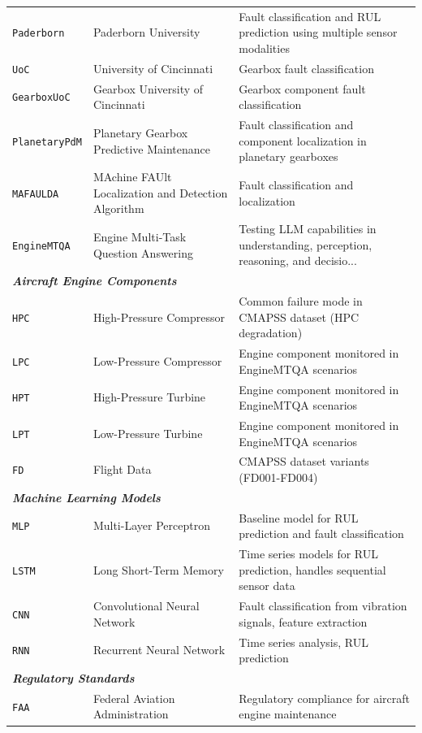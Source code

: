 \begin{table}[ht]
\begin{tabular}{@{}lll@{}}
\texttt{Paderborn} & Paderborn University & Fault classification and RUL prediction using multiple sensor modalities \\
\texttt{UoC} & University of Cincinnati & Gearbox fault classification \\
\texttt{GearboxUoC} & Gearbox University of Cincinnati & Gearbox component fault classification \\
\texttt{PlanetaryPdM} & Planetary Gearbox Predictive Maintenance & Fault classification and component localization in planetary gearboxes \\
\texttt{MAFAULDA} & MAchine FAUlt Localization and Detection Algorithm & Fault classification and localization \\
\texttt{EngineMTQA} & Engine Multi-Task Question Answering & Testing LLM capabilities in understanding, perception, reasoning, and decisio... \\
\midrule
\multicolumn{3}{l}{\textbf{\textit{Aircraft Engine Components}}} \\
\texttt{HPC} & High-Pressure Compressor & Common failure mode in CMAPSS dataset (HPC degradation) \\
\texttt{LPC} & Low-Pressure Compressor & Engine component monitored in EngineMTQA scenarios \\
\texttt{HPT} & High-Pressure Turbine & Engine component monitored in EngineMTQA scenarios \\
\texttt{LPT} & Low-Pressure Turbine & Engine component monitored in EngineMTQA scenarios \\
\texttt{FD} & Flight Data & CMAPSS dataset variants (FD001-FD004) \\
\midrule
\multicolumn{3}{l}{\textbf{\textit{Machine Learning Models}}} \\
\texttt{MLP} & Multi-Layer Perceptron & Baseline model for RUL prediction and fault classification \\
\texttt{LSTM} & Long Short-Term Memory & Time series models for RUL prediction, handles sequential sensor data \\
\texttt{CNN} & Convolutional Neural Network & Fault classification from vibration signals, feature extraction \\
\texttt{RNN} & Recurrent Neural Network & Time series analysis, RUL prediction \\
\midrule
\multicolumn{3}{l}{\textbf{\textit{Regulatory Standards}}} \\
\texttt{FAA} & Federal Aviation Administration & Regulatory compliance for aircraft engine maintenance \\

\end{tabular}
\end{table}
